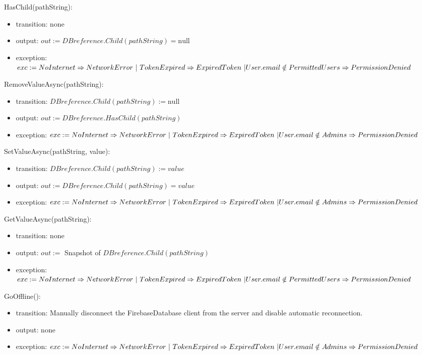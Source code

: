 \documentclass[12pt, titlepage]{article}
\begin{document}
\noindent HasChild(pathString):
\begin{itemize}
\item transition: none 
\item output: $out := DBreference.Child(pathString) = \text{null}$
\item exception: $exc := NoInternet \Rightarrow NetworkError\ | \ TokenExpired \Rightarrow ExpiredToken\ | \\ User.email \notin PermittedUsers \Rightarrow PermissionDenied$
\end{itemize}

\noindent RemoveValueAsync(pathString):
\begin{itemize}
\item transition: $DBreference.Child(pathString) := \text{null}$
\item output: $out := DBreference.HasChild(pathString)$
\item exception: $exc := NoInternet \Rightarrow NetworkError\ | \ TokenExpired \Rightarrow ExpiredToken\ | \\ User.email \notin Admins \Rightarrow PermissionDenied$
\end{itemize}

\noindent SetValueAsync(pathString, value):
\begin{itemize}
\item transition: $DBreference.Child(pathString) := value$
\item output: $out := DBreference.Child(pathString) = value$
\item exception: $exc := NoInternet \Rightarrow NetworkError\ | \ TokenExpired \Rightarrow ExpiredToken\ | \\ User.email \notin Admins \Rightarrow PermissionDenied$
\end{itemize}

\noindent GetValueAsync(pathString):
\begin{itemize}
\item transition: none
\item output: $out :=$ Snapshot of $DBreference.Child(pathString)$
\item exception: $exc := NoInternet \Rightarrow NetworkError\ | \ TokenExpired \Rightarrow ExpiredToken\ | \\ User.email \notin PermittedUsers \Rightarrow PermissionDenied$
\end{itemize}

\noindent GoOffline():
\begin{itemize}
\item transition: Manually disconnect the FirebaseDatabase client from the server and disable automatic reconnection.
\item output: none
\item exception: $exc := NoInternet \Rightarrow NetworkError\ | \ TokenExpired \Rightarrow ExpiredToken\ | \\ User.email \notin Admins \Rightarrow PermissionDenied$
\end{itemize}
\end{document}
